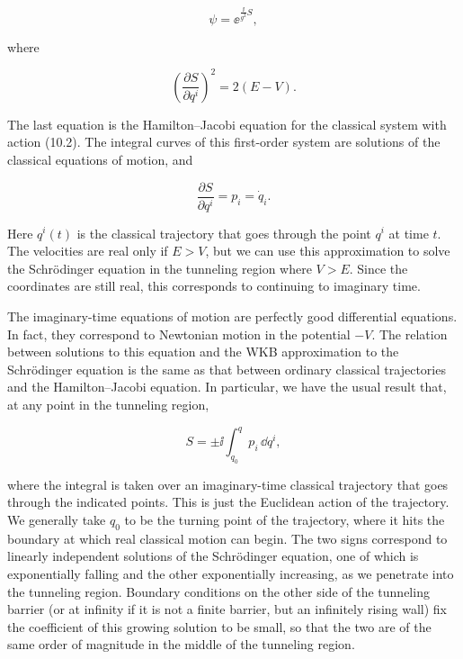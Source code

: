 \begin{equation}
  \psi=\ee^{\frac{\ii}{g^2}S},
  \label{eq:10.3}
\end{equation}

where

\begin{equation}
  \left(\frac{\partial S}{\partial q^i}\right)^2=2(E-V).
  \label{eq:10.4}
\end{equation}

The last equation is the Hamilton--Jacobi equation for the classical system with
action (10.2). The integral curves of this first-order system are solutions of the
classical equations of motion, and

\begin{equation}
  \frac{\partial S}{\partial q^i}=p_i=\dot q_i.
  \label{eq:10.5}
\end{equation}

Here $q^i(t)$ is the classical trajectory that goes through the point $q^i$ at
time $t$. The velocities are real only if $E>V$, but we can use this
approximation to solve the Schrödinger equation in the tunneling region where
$V>E$. Since the coordinates are still real, this corresponds to continuing to
imaginary time.

The imaginary-time equations of motion are perfectly good differential equations.
In fact, they correspond to Newtonian motion in the potential $-V$. The relation
between solutions to this equation and the WKB approximation to the Schrödinger
equation is the same as that between ordinary classical trajectories and the
Hamilton--Jacobi equation. In particular, we have the usual result that, at any
point in the tunneling region,

\begin{equation}
  S=\pm\ii\int_{q_0}^{q}p_i\,\dd q^i,
  \label{eq:10.6}
\end{equation}

where the integral is taken over an imaginary-time classical trajectory that goes
through the indicated points. This is just the Euclidean action of the trajectory.
We generally take $q_0$ to be the turning point of the trajectory, where it hits
the boundary at which real classical motion can begin. The two signs correspond
to linearly independent solutions of the Schrödinger equation, one of which is
exponentially falling and the other exponentially increasing, as we penetrate
into the tunneling region. Boundary conditions on the other side of the
tunneling barrier (or at infinity if it is not a finite barrier, but an infinitely
rising wall) fix the coefficient of this growing solution to be small, so that the
two are of the same order of magnitude in the middle of the tunneling region.

